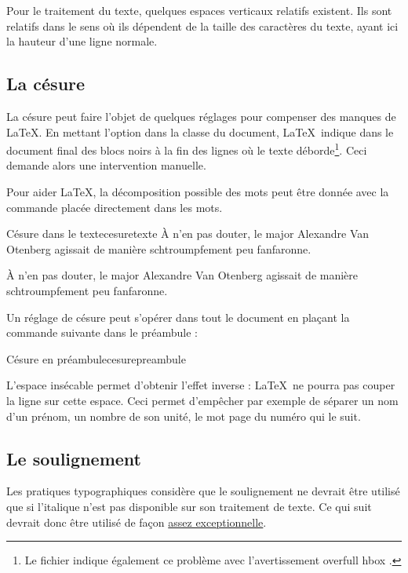 Pour le traitement du texte, quelques espaces verticaux relatifs existent. Ils sont relatifs dans le sens où ils dépendent de la taille des caractères du texte,  ayant ici la hauteur d'une ligne normale.


\subsection{La césure}
\label{cesure}
La césure peut faire l'objet de quelques réglages pour compenser des manques de \LaTeX. En mettant l'option  dans la classe du document, \LaTeX\ indique dans le document final des blocs noirs à la fin des lignes où le texte déborde\footnote{Le fichier  indique également ce problème avec l'avertissement \og overfull \macro{}hbox \fg.}. Ceci demande alors une intervention manuelle.

Pour aider \LaTeX, la décomposition possible des mots peut être donnée avec la commande \macro{-} placée directement dans les mots.

\begin{codedouble}{Césure dans le texte}{cesuretexte}
À n'en pas douter, le major Alexandre Van Otenberg agissait de manière schtroumpfement 
peu fanfaronne.

À n'en pas douter, le major Alexandre Van Otenberg agissait de manière 
schtroumpfe\-ment peu fanfaronne.
\end{codedouble}

Un réglage de césure peut s'opérer dans tout le document en plaçant la commande suivante dans le préambule :

\begin{codesimple}{Césure en préambule}{cesurepreambule}
\end{codesimple}

L'espace insécable \macron{\~{}} permet d'obtenir l'effet inverse : \LaTeX\ ne pourra pas couper la ligne sur cette espace. Ceci permet d'empêcher par exemple de séparer un nom d'un prénom, un nombre de son unité, le mot \og page \fg du numéro qui le suit.

\subsection{Le soulignement}

Les pratiques typographiques considère que le soulignement ne devrait être utilisé que si l'italique n'est pas disponible sur son traitement de texte. Ce qui suit devrait donc être utilisé de façon \uline{assez exceptionnelle}.

